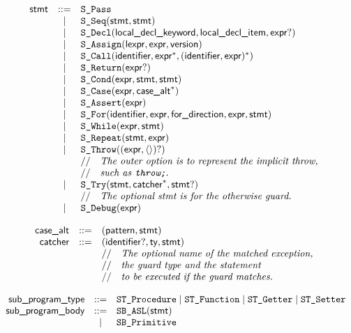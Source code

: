 \documentclass{book}
\begin{document}
\[
\begin{array}{rcl}
\textsf{stmt} &::=& \texttt{S\_Pass}\\
  &|& \texttt{S\_Seq}(\textsf{stmt}, \textsf{stmt})\\
  &|& \texttt{S\_Decl}(\textsf{local\_decl\_keyword}, \textsf{local\_decl\_item}, \textsf{expr}?)\\
  &|& \texttt{S\_Assign}(\textsf{lexpr}, \textsf{expr}, \textsf{version})\\
  &|& \texttt{S\_Call}(\textsf{identifier}, \textsf{expr}^*, (\textsf{identifier}, \textsf{expr})^*)\\
  &|& \texttt{S\_Return}(\textsf{expr}?)\\
  &|& \texttt{S\_Cond}(\textsf{expr}, \textsf{stmt}, \textsf{stmt})\\
  &|& \texttt{S\_Case}(\textsf{expr}, \textsf{case\_alt}^*)\\
  &|& \texttt{S\_Assert}(\textsf{expr})\\
  &|& \texttt{S\_For}(\textsf{identifier}, \textsf{expr}, \textsf{for\_direction}, \textsf{expr}, \textsf{stmt})\\
  &|& \texttt{S\_While}(\textsf{expr}, \textsf{stmt})\\
  &|& \texttt{S\_Repeat}(\textsf{stmt}, \textsf{expr})\\
  &|& \texttt{S\_Throw}((\textsf{expr}, \langle\rangle)?)\\
  & & //\quad\textit{The outer option is to represent the implicit throw,}\ \\
  & & //\quad\textit{such as \texttt{throw;}.}\ \\
  &|& \texttt{S\_Try}(\textsf{stmt}, \textsf{catcher}^*, \textsf{stmt}?)\\
  & & //\quad\textit{The optional stmt is for the otherwise guard.}\ \\
  &|& \texttt{S\_Debug}(\textsf{expr})
\end{array}
\]

\[
\begin{array}{rcl}
\textsf{case\_alt} &::=& (\textsf{pattern}, \textsf{stmt})\\
\textsf{catcher} &::=& (\textsf{identifier}?, \textsf{ty}, \textsf{stmt})\\
  & & //\quad\textit{The optional name of the matched exception,}\ \\
  & & //\quad\textit{the guard type and the statement}\ \\
  & & //\quad\textit{to be executed if the guard matches.}\ \\
\end{array}
\]

\[
\begin{array}{rcl}
\textsf{sub\_program\_type} &::=& \texttt{ST\_Procedure} \;|\; \texttt{ST\_Function} \;|\; \texttt{ST\_Getter} \;|\; \texttt{ST\_Setter}\\
\textsf{sub\_program\_body} &::=& \texttt{SB\_ASL}(\textsf{stmt})\\
  &|& \texttt{SB\_Primitive}\\
\end{array}
\]
\end{document}
